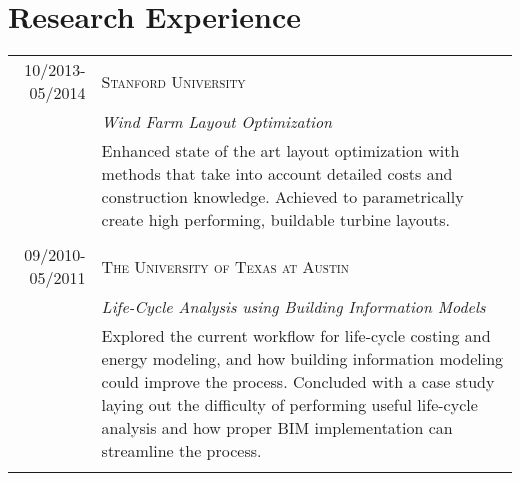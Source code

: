 \documentclass[a4paper,10pt]{article}
\begin{document}
\section{Research Experience}
\begin{tabularx}{\textwidth}{r|X}

 \textsc{10/2013-05/2014} &  \textsc{Stanford University}\\&\emph{Wind Farm Layout Optimization}\\&\footnotesize{Enhanced state of the art layout optimization with methods that take into account detailed costs and construction knowledge. Achieved to parametrically create high performing, buildable turbine layouts.}\\\multicolumn{2}{c}{} \\

\textsc{09/2010-05/2011} &  \textsc{The University of Texas at Austin}\\&\emph{Life-Cycle Analysis using Building Information Models}\\&\footnotesize{Explored the current workflow for life-cycle costing and energy modeling, and how building information modeling could improve the process. Concluded with a case study laying out the difficulty of performing useful life-cycle analysis and how proper BIM implementation can streamline the process.}\\\multicolumn{2}{c}{} \\


\end{tabularx}




\end{document}
